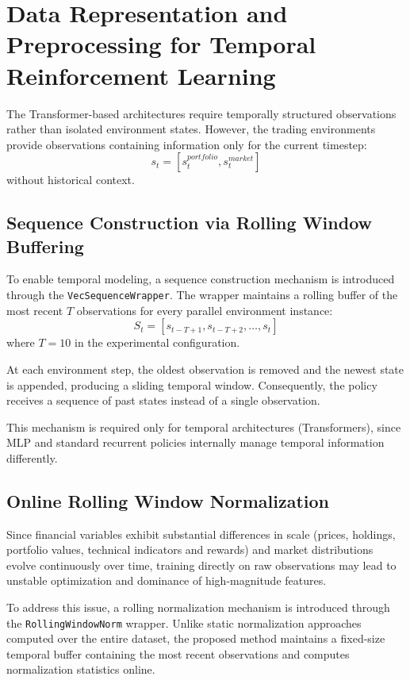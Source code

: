 \section{Data Representation and Preprocessing for Temporal Reinforcement Learning}

The Transformer-based architectures require temporally structured observations rather
than isolated environment states. However, the trading environments provide observations
containing information only for the current timestep:
\[
s_t =
[s_t^{portfolio}, s_t^{market}]
\]
without historical context.

\subsection{Sequence Construction via Rolling Window Buffering}

To enable temporal modeling, a sequence construction mechanism is introduced through the
\texttt{VecSequenceWrapper}. The wrapper maintains a rolling buffer of the most recent
$T$ observations for every parallel environment instance:
\[
S_t
=
[s_{t-T+1}, s_{t-T+2}, \dots, s_t]
\]
where $T=10$ in the experimental configuration.

At each environment step, the oldest observation is removed and the newest state is
appended, producing a sliding temporal window. Consequently, the policy receives a
sequence of past states instead of a single observation.

This mechanism is required only for temporal architectures (Transformers), since MLP and
standard recurrent policies internally manage temporal information differently.

\subsection{Online Rolling Window Normalization}

Since financial variables exhibit substantial differences in scale (prices, holdings,
portfolio values, technical indicators and rewards) and market distributions evolve
continuously over time, training directly on raw observations may lead to unstable
optimization and dominance of high-magnitude features.

To address this issue, a rolling normalization mechanism is introduced through the
\texttt{RollingWindowNorm} wrapper. Unlike static normalization approaches computed
over the entire dataset, the proposed method maintains a fixed-size temporal buffer
containing the most recent observations and computes normalization statistics online.

